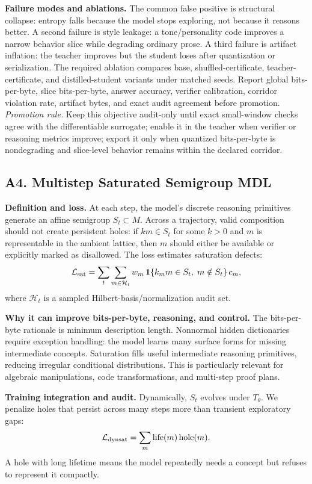 \documentclass[10pt]{article}
\newcommand{\loss}{\mathcal{L}}
\numberwithin{equation}{section}
\begin{document}
\noindent\textbf{Failure modes and ablations.} The common false positive is structural collapse: entropy falls because the model stops exploring, not because it reasons better. A second failure is style leakage: a tone/personality code improves a narrow behavior slice while degrading ordinary prose. A third failure is artifact inflation: the teacher improves but the student loses after quantization or serialization. The required ablation compares base, shuffled-certificate, teacher-certificate, and distilled-student variants under matched seeds. Report global bits-per-byte, slice bits-per-byte, answer accuracy, verifier calibration, corridor violation rate, artifact bytes, and exact audit agreement before promotion.
\vfill
\noindent\emph{Promotion rule.} Keep this objective audit-only until exact small-window checks agree with the differentiable surrogate; enable it in the teacher when verifier or reasoning metrics improve; export it only when quantized bits-per-byte is nondegrading and slice-level behavior remains within the declared corridor.
\clearpage
\subsection{A4. Multistep Saturated Semigroup MDL}
\noindent\textbf{Definition and loss.} At each step, the model's discrete reasoning primitives generate an affine semigroup $S_t\subset M$. Across a trajectory, valid composition should not create persistent holes: if $k m\in S_t$ for some $k>0$ and $m$ is representable in the ambient lattice, then $m$ should either be available or explicitly marked as disallowed. The loss estimates saturation defects:
\[
\loss_{\rm sat}=\sum_{t}\sum_{m\in\mathcal H_t} w_m\,\mathbf 1\{k_m m\in S_t,\;m\notin S_t\}\,c_m,
\]
where $\mathcal H_t$ is a sampled Hilbert-basis/normalization audit set.

\noindent\textbf{Why it can improve bits-per-byte, reasoning, and control.} The bits-per-byte rationale is minimum description length. Nonnormal hidden dictionaries require exception handling: the model learns many surface forms for missing intermediate concepts. Saturation fills useful intermediate reasoning primitives, reducing irregular conditional distributions. This is particularly relevant for algebraic manipulations, code transformations, and multi-step proof plans.

\noindent\textbf{Training integration and audit.} Dynamically, $S_t$ evolves under $T_\theta$. We penalize holes that persist across many steps more than transient exploratory gaps:
\[
\loss_{\rm dynsat}=\sum_m \mathrm{life}(m)\,\mathrm{hole}(m).
\]
A hole with long lifetime means the model repeatedly needs a concept but refuses to represent it compactly.
\end{document}
